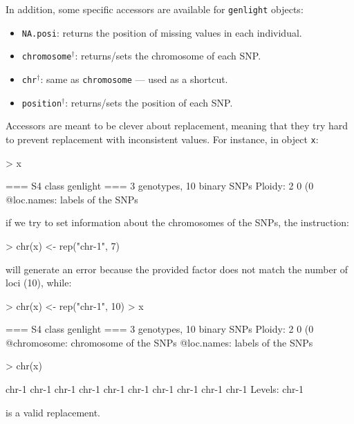 \documentclass{article}
\begin{document}
\noindent
In addition, some specific accessors are available for \texttt{genlight} objects:
\begin{itemize}
  \item \texttt{NA.posi}: returns the position of missing values in each individual.
  \item \texttt{chromosome}$^{\dagger}$: returns/sets the chromosome of each SNP.
  \item \texttt{chr}$^{\dagger}$: same as \texttt{chromosome} --- used as a shortcut.
  \item \texttt{position}$^{\dagger}$: returns/sets the position of each SNP.
\end{itemize}


Accessors are meant to be clever about replacement, meaning that they try hard to prevent
replacement with inconsistent values. For instance, in object \texttt{x}:
\begin{Schunk}
\begin{Sinput}
> x
\end{Sinput}
\begin{Soutput}
 === S4 class genlight ===
 3 genotypes,  10 binary SNPs
 Ploidy: 2
 0 (0 %
 @loc.names: labels of the SNPs
\end{Soutput}
\end{Schunk}
if we try to set information about the chromosomes of the SNPs, the instruction:
\begin{Schunk}
\begin{Sinput}
> chr(x) <- rep("chr-1", 7)
\end{Sinput}
\end{Schunk}
will generate an error because the provided factor does not match the number of loci (10), while:
\begin{Schunk}
\begin{Sinput}
> chr(x) <- rep("chr-1", 10)
> x
\end{Sinput}
\begin{Soutput}
 === S4 class genlight ===
 3 genotypes,  10 binary SNPs
 Ploidy: 2
 0 (0 %
 @chromosome: chromosome of the SNPs
 @loc.names: labels of the SNPs
\end{Soutput}
\begin{Sinput}
> chr(x)
\end{Sinput}
\begin{Soutput}
 [1] chr-1 chr-1 chr-1 chr-1 chr-1 chr-1 chr-1 chr-1 chr-1 chr-1
Levels: chr-1
\end{Soutput}
\end{Schunk}
is a valid replacement.
\end{document}
